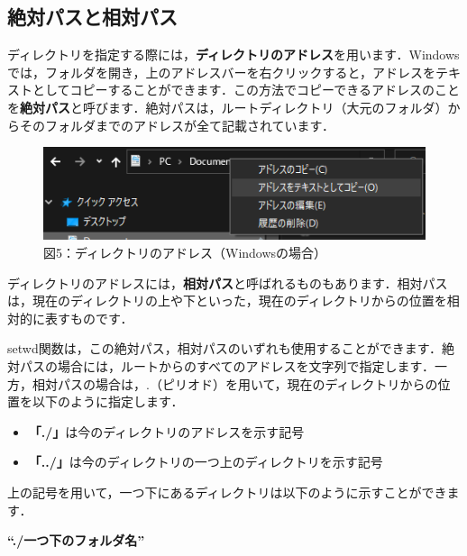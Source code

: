 \documentclass[
  letterpaper,
  DIV=11,
  numbers=noendperiod]{scrreprt}
\providecommand{\tightlist}{%
  \setlength{\itemsep}{0pt}\setlength{\parskip}{0pt}}\usepackage{longtable,booktabs,array}
\begin{document}
\hypertarget{ux7d76ux5bfeux30d1ux30b9ux3068ux76f8ux5bfeux30d1ux30b9}{%
\subsection{絶対パスと相対パス}\label{ux7d76ux5bfeux30d1ux30b9ux3068ux76f8ux5bfeux30d1ux30b9}}

ディレクトリを指定する際には，\textbf{ディレクトリのアドレス}を用います．Windowsでは，フォルダを開き，上のアドレスバーを右クリックすると，アドレスをテキストとしてコピーすることができます．この方法でコピーできるアドレスのことを\textbf{絶対パス}と呼びます．絶対パスは，ルートディレクトリ（大元のフォルダ）からそのフォルダまでのアドレスが全て記載されています．

\begin{figure}

{\centering \includegraphics{././image/directory_address.png}

}

\caption{図5：ディレクトリのアドレス（Windowsの場合）}

\end{figure}

ディレクトリのアドレスには，\textbf{相対パス}と呼ばれるものもあります．相対パスは，現在のディレクトリの上や下といった，現在のディレクトリからの位置を相対的に表すものです．

setwd関数は，この絶対パス，相対パスのいずれも使用することができます．絶対パスの場合には，ルートからのすべてのアドレスを文字列で指定します．一方，相対パスの場合は，.（ピリオド）を用いて，現在のディレクトリからの位置を以下のように指定します．

\begin{itemize}
\tightlist
\item
  \textbf{「./」}は今のディレクトリのアドレスを示す記号
\item
  \textbf{「../」}は今のディレクトリの一つ上のディレクトリを示す記号
\end{itemize}

上の記号を用いて，一つ下にあるディレクトリは以下のように示すことができます．

\textbf{``./一つ下のフォルダ名''}
\end{document}

